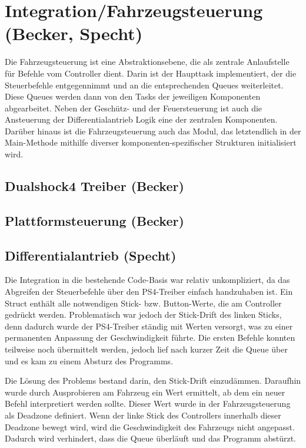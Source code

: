 \section{Integration/Fahrzeugsteuerung (Becker, Specht)}

Die Fahrzeugsteuerung ist eine Abstraktionsebene, die als zentrale Anlaufstelle für Befehle vom Controller dient. Darin ist der Haupttask implementiert, der die Steuerbefehle entgegennimmt und an die entsprechenden Queues weiterleitet. Diese Queues werden dann von den Tasks der jeweiligen Komponenten abgearbeitet. Neben der Geschütz- und der Feuersteuerung ist auch die Ansteuerung der Differentialantrieb Logik eine der zentralen Komponenten. Darüber hinaus ist die Fahrzeugsteuerung auch das Modul, das letztendlich in der Main-Methode mithilfe diverser komponenten-spezifischer Strukturen initialisiert wird. \newline

\subsection{Dualshock4 Treiber (Becker)}

\subsection{Plattformsteuerung (Becker)}

\subsection{Differentialantrieb (Specht)} \label{sec:diff_drive_integration}

Die Integration in die bestehende Code-Basis war relativ unkompliziert, da das Abgreifen der Steuerbefehle über den PS4-Treiber einfach handzuhaben ist. Ein Struct enthält alle notwendigen Stick- bzw. Button-Werte, die am Controller gedrückt werden. Problematisch war jedoch der Stick-Drift des linken Sticks, denn dadurch wurde der PS4-Treiber ständig mit Werten versorgt, was zu einer permanenten Anpassung der Geschwindigkeit führte. Die ersten Befehle konnten teilweise noch übermittelt werden, jedoch lief nach kurzer Zeit die Queue über und es kam zu einem Absturz des Programms. \newline

Die Lösung des Problems bestand darin, den Stick-Drift einzudämmen. Daraufhin wurde durch Ausprobieren am Fahrzeug ein Wert ermittelt, ab dem ein neuer Befehl interpretiert werden sollte. Dieser Wert wurde in der Fahrzeugsteuerung als Deadzone definiert. Wenn der linke Stick des Controllers innerhalb dieser Deadzone bewegt wird, wird die Geschwindigkeit des Fahrzeugs nicht angepasst. Dadurch wird verhindert, dass die Queue überläuft und das Programm abstürzt. \newline

